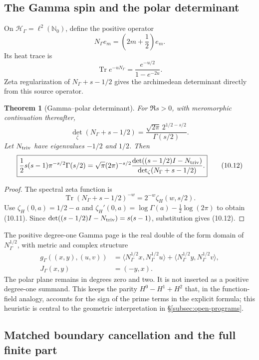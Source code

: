 \documentclass[11pt]{amsart}
\newtheorem{theorem}{Theorem}[section]
\theoremstyle{definition}
\theoremstyle{remark}
\DeclareMathOperator{\Tr}{Tr}
\begin{document}
\subsection{The Gamma spin and the polar determinant}

On \(\mathcal H_\Gamma=\ell^2(\mathbb N_0)\), define the positive operator
\[
 N_\Gamma e_m=\left(2m+\frac12\right)e_m.
\tag{10.9}
\]
Its heat trace is
\[
 \Tr e^{-uN_\Gamma}=\frac{e^{-u/2}}{1-e^{-2u}}.
\tag{10.10}
\]
Zeta regularization of \(N_\Gamma+s-1/2\) gives the archimedean
determinant directly from this source operator.

\begin{theorem}[Gamma--polar determinant]
\label{thm:gamma-polar-det}
For \(\Re s>0\), with meromorphic continuation thereafter,
\[
 \det_\zeta(N_\Gamma+s-1/2)
 =\frac{\sqrt{2\pi}\,2^{1/2-s/2}}{\Gamma(s/2)}.
\tag{10.11}
\]
Let \(N_{\rm triv}\) have eigenvalues \(-1/2\) and \(1/2\).  Then
\[
 \boxed{
 \frac12s(s-1)\pi^{-s/2}\Gamma(s/2)
 =\sqrt\pi(2\pi)^{-s/2}
 \frac{\det((s-1/2)I-N_{\rm triv})}
      {\det_\zeta(N_\Gamma+s-1/2)}.}
\tag{10.12}
\]
\end{theorem}

\begin{proof}
The spectral zeta function is
\[
 \Tr(N_\Gamma+s-1/2)^{-w}
 =2^{-w}\zeta_H(w,s/2).
\]
Use
\(\zeta_H(0,a)=1/2-a\) and
\(\zeta_H'(0,a)=\log\Gamma(a)-\frac12\log(2\pi)\) to obtain
(10.11).  Since
\(\det((s-1/2)I-N_{\rm triv})=s(s-1)\), substitution gives
(10.12).
\end{proof}

The positive degree-one Gamma page is the real double of the form domain
of \(N_\Gamma^{1/2}\), with metric and complex structure
\[
 \begin{aligned}
 g_\Gamma((x,y),(u,v))
 &=\langle N_\Gamma^{1/2}x,N_\Gamma^{1/2}u\rangle
  +\langle N_\Gamma^{1/2}y,N_\Gamma^{1/2}v\rangle,\\
 J_\Gamma(x,y)&=(-y,x).
 \end{aligned}
\tag{10.13}
\]
The polar plane remains in degrees zero and two.  It is not inserted as a
positive degree-one summand.  This keeps the parity \(H^0-H^1+H^2\) that, in the
function-field analogy, accounts for the sign of the prime terms in the
explicit formula; this heuristic is central to the geometric interpretation in
\S\ref{subsec:open-programs}.

\subsection{Matched boundary cancellation and the full finite part}
\end{document}
